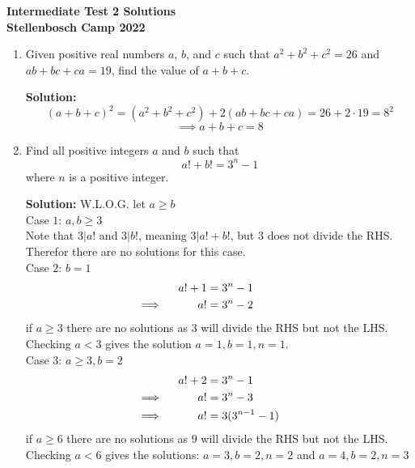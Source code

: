 \documentclass{article}
\begin{document}
\thispagestyle{empty}

\begin{center}
  \textbf{Intermediate Test 2 Solutions}
  \\ \vspace{1em}
  \textbf{\large Stellenbosch Camp 2022}
\end{center}


\begin{enumerate}[itemsep=24pt]

\item %
Given positive real numbers $a$, $b$, and $c$ such that $a^2+b^2+c^2 = 26$ and $ab+bc+ca = 19$, find the value of $a+b+c$.

\textbf{Solution:} 
\[(a+b+c)^2 = (a^2+b^2+c^2) + 2(ab + bc + ca) = 26 + 2\cdot 19 = 8^2\]
\[\implies a+b+c = 8\]

\item
Find all positive integers $a$ and $b$ such that 
$$a! + b! = 3^n -1 $$
where $n$ is a positive integer.

\textbf{Solution:} 
W.L.O.G. let $a\geq b$\\

Case $1$: $a,b\geq3$\\
Note that $3|a!$ and $3|b!$, meaning $3|a!+b!$, but $3$ does not divide the RHS. Therefor there are no solutions for this case.\\

Case $2$: $b=1$
\begin{align*}
    a!+1&=3^n-1\\
    \implies \hspace{10mm} a!&=3^n-2 \hspace{15mm}
\end{align*}
if $a\geq3$ there are no solutions as $3$ will divide the RHS but not the LHS. Checking $a<3$ gives the solution $a=1, b=1, n=1$.\\

Case $3$: $a\geq3, b=2$
\begin{align*}
    a!+2&=3^n-1\\
    \implies \hspace{10mm} a!&=3^n-3 \hspace{10mm} \\
    \implies \hspace{10mm} a!&=3(3^{n-1}-1) \hspace{7mm}
\end{align*}
if $a\geq6$ there are no solutions as $9$ will divide the RHS but not the LHS. Checking $a<6$ gives the solutions: $a=3, b=2, n=2$ and $a=4, b=2, n=3$


\end{enumerate}
\end{document}
